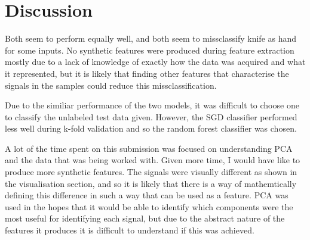 \documentclass[12pt]{article}
\begin{document}
\section{Discussion}

Both seem to perform equally well, and both seem to missclassify knife as hand for some inputs. No synthetic features were produced during feature extraction mostly due to a lack of knowledge of exactly how the data was acquired and what it represented, but it is likely that finding other features that characterise the signals in the samples could reduce this missclassification.

Due to the similiar performance of the two models, it was difficult to choose one to classify the unlabeled test data given. However, the SGD classifier performed less well during k-fold validation and so the random forest classifier was chosen.

A lot of the time spent on this submission was focused on understanding PCA and the data that was being worked with. Given more time, I would have like to produce more synthetic features. The signals were visually different as shown in the visualisation section, and so it is likely that there is a way of mathemtically defining this difference in such a way that can be used as a feature. PCA was used in the hopes that it would be able to identify which components were the most useful for identifying each signal, but due to the abstract nature of the features it produces it is difficult to understand if this was achieved. 



\end{document}
